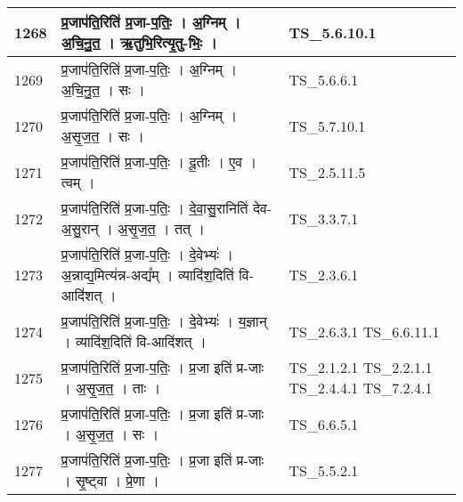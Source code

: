 \documentclass[17pt]{extarticle}
\begin{document}
\begin{longtable}{||p{0.4in}||p{4.9in}||p{0.9in}||}
    \hline
        
    1268 & प्र॒जाप॑ति॒रिति॑ प्र॒जा{-}प॒तिः॒   ।   अ॒ग्निम्   ।   अ॒चि॒नु॒त॒   ।   ऋ॒तुभि॒रित्यृ॒तु{-}भिः॒   ।    & TS\_5.6.10.1       \\
    
    \hline
        
    1269 & प्र॒जाप॑ति॒रिति॑ प्र॒जा{-}प॒तिः॒   ।   अ॒ग्निम्   ।   अ॒चि॒नु॒त॒   ।   सः   ।    & TS\_5.6.6.1       \\
    
    \hline
        
    1270 & प्र॒जाप॑ति॒रिति॑ प्र॒जा{-}प॒तिः॒   ।   अ॒ग्निम्   ।   अ॒सृ॒ज॒त॒   ।   सः   ।    & TS\_5.7.10.1       \\
    
    \hline
        
    1271 & प्र॒जाप॑ति॒रिति॑ प्र॒जा{-}प॒तिः॒   ।   दू॒तीः   ।   ए॒व   ।   त्वम्   ।    & TS\_2.5.11.5       \\
    
    \hline
        
    1272 & प्र॒जाप॑ति॒रिति॑ प्र॒जा{-}प॒तिः॒   ।   दे॒वा॒सु॒रानिति॑ देव{-}अ॒सु॒रान्   ।   अ॒सृ॒ज॒त॒   ।   तत्   ।    & TS\_3.3.7.1       \\
    
    \hline
        
    1273 & प्र॒जाप॑ति॒रिति॑ प्र॒जा{-}प॒तिः॒   ।   दे॒वेभ्यः॑   ।   अ॒न्नाद्य॒मित्य॑न्न{-}अद्य᳚म्   ।   व्यादि॑श॒दिति॑ वि{-}आदि॑शत्   ।    & TS\_2.3.6.1       \\
    
    \hline
        
    1274 & प्र॒जाप॑ति॒रिति॑ प्र॒जा{-}प॒तिः॒   ।   दे॒वेभ्यः॑   ।   य॒ज्ञान्   ।   व्यादि॑श॒दिति॑ वि{-}आदि॑शत्   ।    & TS\_2.6.3.1 TS\_6.6.11.1       \\
    
    \hline
        
    1275 & प्र॒जाप॑ति॒रिति॑ प्र॒जा{-}प॒तिः॒   ।   प्र॒जा इति॑ प्र{-}जाः   ।   अ॒सृ॒ज॒त॒   ।   ताः   ।    & TS\_2.1.2.1 TS\_2.2.1.1 TS\_2.4.4.1 TS\_7.2.4.1       \\
    
    \hline
        
    1276 & प्र॒जाप॑ति॒रिति॑ प्र॒जा{-}प॒तिः॒   ।   प्र॒जा इति॑ प्र{-}जाः   ।   अ॒सृ॒ज॒त॒   ।   सः   ।    & TS\_6.6.5.1       \\
    
    \hline
        
    1277 & प्र॒जाप॑ति॒रिति॑ प्र॒जा{-}प॒तिः॒   ।   प्र॒जा इति॑ प्र{-}जाः   ।   सृ॒ष्ट्वा   ।   प्रे॒णा   ।    & TS\_5.5.2.1       \\
    

\end{longtable}
\end{document}
